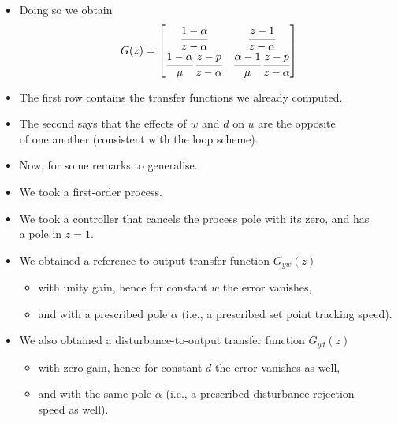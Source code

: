 \begin{frame}
\myPause
 \begin{itemize}[<+-| alert@+>]
 \item Doing so we obtain
       \begin{displaymath}
        G(z) =
        \begin{bmatrix} 
         \cfrac{1-\alpha}{z-\alpha}                   & \cfrac{z-1}{z-\alpha} \\
         \cfrac{1-\alpha}{\mu}\,\cfrac{z-p}{z-\alpha} & \cfrac{\alpha-1}{\mu}\,\cfrac{z-p}{z-\alpha}
        \end{bmatrix}
       \end{displaymath}
 \item The first row contains the transfer functions we already computed.
 \item The second says that the effects of $w$ and $d$ on $u$ are the opposite\\
       of one another (consistent with the loop scheme).
 \item \vfill Now, for some remarks to generalise.
 \end{itemize}
\end{frame}

\begin{frame}
\myPause
 \begin{itemize}[<+-| alert@+>]
 \item We took a first-order process.
 \item We took a controller that cancels the process pole with its zero, and has\\
       a pole in $z=1$.
 \item We obtained a reference-to-output transfer function $G_{yw}(z)$
       \begin{itemize}[<+-| alert@+>]
       \item with unity gain, hence for constant $w$ the error vanishes,
       \item and with a prescribed pole $\alpha$ (i.e., a prescribed set point tracking speed).
       \end{itemize}
 \item We also obtained a disturbance-to-output transfer function $G_{yd}(z)$
       \begin{itemize}[<+-| alert@+>]
       \item with zero gain, hence for constant $d$ the error vanishes as well,
       \item and with the same pole $\alpha$ (i.e., a prescribed disturbance rejection\\
             speed as well).
       \end{itemize}
 \end{itemize}
\end{frame}

